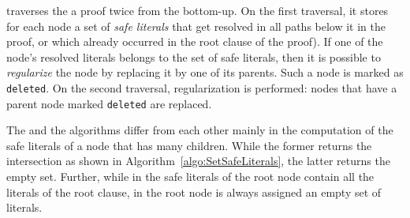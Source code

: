 \documentclass{llncs}
\begin{document}
{\RPI} traverses the a proof twice from the bottom-up. On the first traversal, it stores for each node a set of \emph{safe literals} that get resolved in all paths below it in the proof, or which already occurred in the root clause of the proof). If one of the node's resolved literals belongs to the set of safe literals, then it is possible to \emph{regularize} the node by replacing it by one of its parents. Such a node is marked as \texttt{deleted}. On the second traversal, regularization is performed: nodes that have a parent node marked \texttt{deleted} are replaced.

The {\RPI} and the {\RP} algorithms differ from each other mainly in the
computation of the safe literals of a node that has many children. While the former 
returns the intersection as shown in Algorithm~\ref{algo:SetSafeLiterals}, the latter
returns the empty set. 
Further, while in {\RPI} the safe literals of the root node contain all the literals of the root clause, in {\RP} the root node is always assigned an empty set of literals. 










\begin{footnotesize}
%


\end{footnotesize}
\appendix

\end{document}
